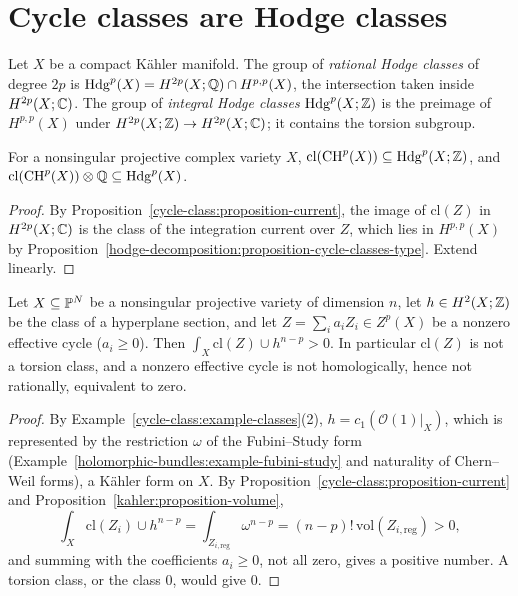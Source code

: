 \section{Cycle classes are Hodge classes}\label{cycle-class:section-hodge-classes}

\begin{definition}\label{cycle-class:definition-hodge-classes}
Let $X$ be a compact K\"ahler manifold. The group of \emph{rational Hodge classes} of degree $2p$ is $\mathrm{Hdg}^p(X) = H^{2p}(X; \mathbb{Q}) \cap H^{p,p}(X)$, the intersection taken inside
$H^{2p}(X; \mathbb{C})$. The group of \emph{integral Hodge classes} $\mathrm{Hdg}^p(X; \mathbb{Z})$ is the preimage of $H^{p,p}(X)$ under $H^{2p}(X; \mathbb{Z}) \to H^{2p}(X; \mathbb{C})$; it contains the torsion
subgroup.
\end{definition}

\begin{corollary}\label{cycle-class:corollary-hodge-classes}
For a nonsingular projective complex variety $X$, $\mathrm{cl}(\operatorname{CH}^p(X)) \subseteq \mathrm{Hdg}^p(X; \mathbb{Z})$, and $\mathrm{cl}(\operatorname{CH}^p(X)) \otimes \mathbb{Q} \subseteq \mathrm{Hdg}^p(X)$.
\end{corollary}

\begin{proof}
By Proposition~\ref{cycle-class:proposition-current}, the image of $\mathrm{cl}(Z)$ in $H^{2p}(X; \mathbb{C})$ is the class of the integration current over $Z$, which lies in $H^{p,p}(X)$ by
Proposition~\ref{hodge-decomposition:proposition-cycle-classes-type}. Extend linearly.
\end{proof}

\begin{corollary}\label{cycle-class:corollary-effective}
Let $X \subseteq \mathbb{P}^N$ be a nonsingular projective variety of dimension $n$, let $h \in H^2(X; \mathbb{Z})$ be the class of a hyperplane section, and let $Z = \sum_ia_iZ_i \in Z^p(X)$ be a nonzero effective cycle
($a_i \geq 0$). Then $\int_X\mathrm{cl}(Z) \cup h^{n-p} > 0$. In particular $\mathrm{cl}(Z)$ is not a torsion class, and a nonzero effective cycle is not homologically, hence not rationally, equivalent to zero.
\end{corollary}

\begin{proof}
By Example~\ref{cycle-class:example-classes}(2), $h = c_1(\mathcal{O}(1)|_X)$, which is represented by the restriction $\omega$ of the Fubini--Study form (Example~\ref{holomorphic-bundles:example-fubini-study}
and naturality of Chern--Weil forms), a K\"ahler form on $X$. By Proposition~\ref{cycle-class:proposition-current} and Proposition~\ref{kahler:proposition-volume},
\[
\int_X\mathrm{cl}(Z_i) \cup h^{n-p} = \int_{Z_{i,\mathrm{reg}}}\omega^{n-p} = (n-p)!\,\mathrm{vol}(Z_{i,\mathrm{reg}}) > 0,
\]
and summing with the coefficients $a_i \geq 0$, not all zero, gives a positive number. A torsion class, or the class $0$, would give $0$.
\end{proof}


